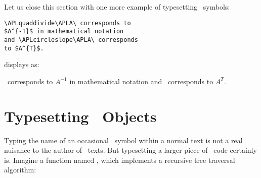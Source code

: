 Let us close this section with one more example of typesetting
\APL\ symbols:
 
\begin{verbatim}
\APLquaddivide\APLA\ corresponds to
$A^{-1}$ in mathematical notation
and \APLcircleslope\APLA\ corresponds
to $A^{T}$.
\end{verbatim}
 
{\parindent=0pt
displays as:}
 
\APLquaddivide\APLA\ corresponds to
$A^{-1}$ in mathematical notation
and \APLcircleslope\APLA\ corresponds
to $A^{T}$.
 
 
\section{Typesetting \bfAPL\ Objects}
 
Typing the name of an occasional \APL\ symbol within a normal
text is not a real nuisance to the author of \APL\ texts.
But typesetting a larger piece of \APL\ code certainly is.
Imagine a function named {\APLdelta\APLT\APLR\APLE\APLE}, which
implements a recursive tree traversal algorithm:
 
